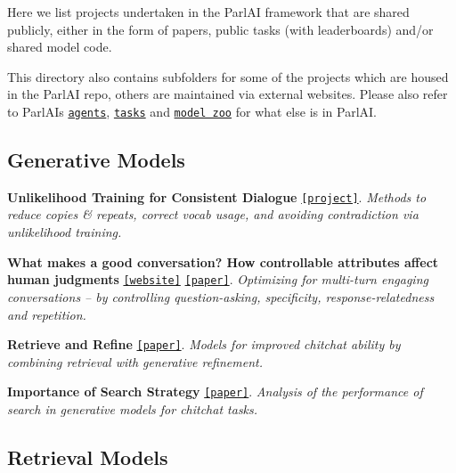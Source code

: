 Here we list projects undertaken in the Parl\+AI framework that are shared publicly, either in the form of papers, public tasks (with leaderboards) and/or shared model code.

This directory also contains subfolders for some of the projects which are housed in the Parl\+AI repo, others are maintained via external websites. Please also refer to Parl\+AI\textquotesingle{}s \href{https://github.com/facebookresearch/ParlAI/tree/master/parlai/tasks}{\tt agents}, \href{https://github.com/facebookresearch/ParlAI/tree/master/parlai/agents}{\tt tasks} and \href{https://github.com/facebookresearch/ParlAI/tree/master/parlai/zoo}{\tt model zoo} for what else is in Parl\+AI.

\subsection*{Generative Models}


\begin{DoxyItemize}
\item {\bfseries Unlikelihood Training for Consistent Dialogue} \href{https://parl.ai/projects/dialogue_unlikelihood/}{\tt \mbox{[}project\mbox{]}}. {\itshape Methods to reduce copies \& repeats, correct vocab usage, and avoiding contradiction via unlikelihood training.}
\item {\bfseries What makes a good conversation? How controllable attributes affect human judgments} \href{https://github.com/facebookresearch/ParlAI/tree/master/projects/controllable_dialogue}{\tt \mbox{[}website\mbox{]}} \href{https://arxiv.org/abs/1902.08654}{\tt \mbox{[}paper\mbox{]}}. {\itshape Optimizing for multi-\/turn engaging conversations -- by controlling question-\/asking, specificity, response-\/relatedness and repetition.}
\item {\bfseries Retrieve and Refine} \href{https://arxiv.org/abs/1808.04776}{\tt \mbox{[}paper\mbox{]}}. {\itshape Models for improved chitchat ability by combining retrieval with generative refinement.}
\item {\bfseries Importance of Search Strategy} \href{https://arxiv.org/abs/1811.00907}{\tt \mbox{[}paper\mbox{]}}. {\itshape Analysis of the performance of search in generative models for chitchat tasks.}
\end{DoxyItemize}

\subsection*{Retrieval Models}


